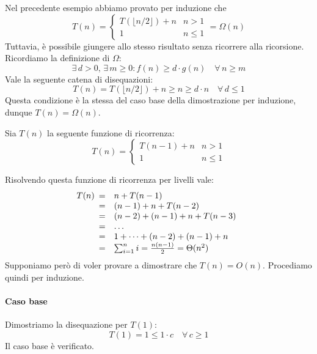 \begin{note}
    Nel precedente esempio abbiamo provato per induzione che
    \[T(n)=\begin{cases}
        T(\lfloor n/2\rfloor)+n & n>1\\
        1 & n\leq1
    \end{cases}=\Omega(n)\]
    Tuttavia, è possibile giungere allo stesso risultato senza ricorrere alla
    ricorsione.  Ricordiamo la definizione di \hyperref[def:5]{$\Omega$}:
    \[\exists\,d>0,\,\exists\,m\geq0:f(n)\geq d\cdot g(n)\quad\forall\,n\geq m\]
    Vale la seguente catena di disequazioni:
    \[T(n)=T(\lfloor n/2\rfloor)+n\geq n\geq d\cdot n\quad\forall\,d\leq1\]
    Questa condizione è la stessa del caso base della dimostrazione per induzione,
    dunque $T(n)=\Omega(n)$.
\end{note}
\begin{eg}
    Sia $T(n)$ la seguente funzione di ricorrenza:
    \[T(n)=\begin{cases}
        T(n-1)+n & n>1\\
        1 & n\leq1
    \end{cases}\]

    \bigskip\noindent
    Risolvendo questa funzione di ricorrenza per livelli vale:
    \[T(n)\begin{array}[t]{cl}
        = & n + T(n-1)\\
        = & (n-1)+n+T(n-2)\\
        = & (n-2)+(n-1)+n+T(n-3)\\
        = & \dots\\
        = & 1 + \dots + (n-2)+(n-1)+n\\
        = & \sum_{i=1}^n i=\frac{n(n-1)}{2}=\Theta(n^2)
    \end{array}\]
    Supponiamo però di voler provare a dimostrare che $T(n)=O(n)$. Procediamo
    quindi per induzione.

    \paragraph{Caso base} Dimostriamo la disequazione per $T(1)$:
    \[T(1)=1\leq 1\cdot c\quad\forall\,c\geq1\]
    Il caso base è verificato.


\end{eg}
